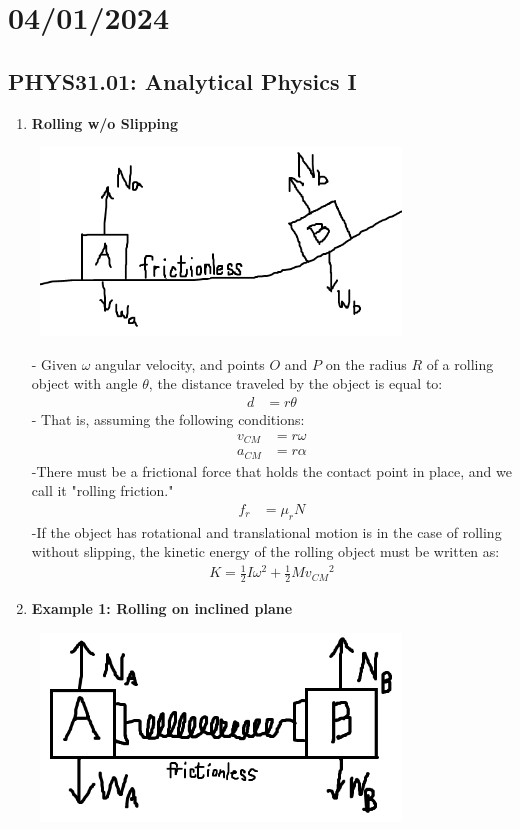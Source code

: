 \documentclass{article}
\begin{document}
\section*{04/01/2024}
\subsection*{PHYS31.01: Analytical Physics I}
        \begin{enumerate}
            \item \textbf{Rolling w/o Slipping}
            \begin{center}\includegraphics[width=10cm, height=5cm]{1.PNG}\end{center}
            - Given $\omega$ angular velocity, and points $O$ and $P$ on the radius $R$ of a rolling object with angle $\theta$, the distance traveled by the object is equal to:
            \begin{align*}
                d&=r\theta
            \end{align*}
            - That is, assuming the following conditions:
            \begin{align*}
                v_{CM}&=r\omega \\
                a_{CM}&=r\alpha
            \end{align*}
            -There must be a frictional force that holds the contact point in place, and we call it "rolling friction."
            \begin{align*}
                f_r&=\mu_rN
            \end{align*}
            -If the object has rotational and translational motion is in the case of rolling without slipping, the kinetic energy of the rolling object must be written as:
            \begin{align*}
                K=\frac{1}{2}I{\omega}^2+\frac{1}{2}M{v_{CM}}^2
            \end{align*}
            \item \textbf{Example 1: Rolling on inclined plane}
            \begin{center}\includegraphics[width=10cm, height=5cm]{2.PNG}\end{center}

\end{enumerate}
\end{document}
